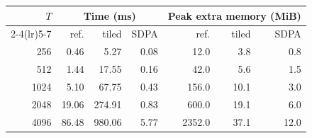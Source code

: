 \begin{tabular}{rrrrrrr}\toprule
$T$ & \multicolumn{3}{c}{Time (ms)} & \multicolumn{3}{c}{Peak extra memory (MiB)} \\
\cmidrule(lr){2-4}\cmidrule(lr){5-7}
 & ref. & tiled & SDPA & ref. & tiled & SDPA \\ \midrule
256 & 0.46 & 5.27 & 0.08 & 12.0 & 3.8 & 0.8 \\
512 & 1.44 & 17.55 & 0.16 & 42.0 & 5.6 & 1.5 \\
1024 & 5.10 & 67.75 & 0.43 & 156.0 & 10.1 & 3.0 \\
2048 & 19.06 & 274.91 & 0.83 & 600.0 & 19.1 & 6.0 \\
4096 & 86.48 & 980.06 & 5.77 & 2352.0 & 37.1 & 12.0 \\
\bottomrule\end{tabular}